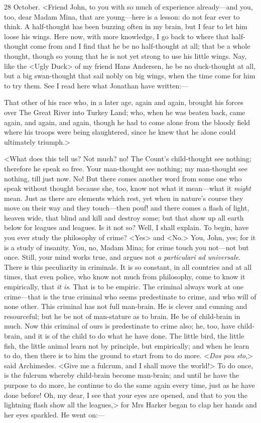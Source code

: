 \begin{diary}{28 October.}
<Friend John, to you with so much of experience already—and you, too, dear Madam Mina, that are young—here is a lesson: do not fear ever to think. A half-thought has been buzzing often in my brain, but I fear to let him loose his wings. Here now, with more knowledge, I go back to where that half-thought come from and I find that he be no half-thought at all; that be a whole thought, though so young that he is not yet strong to use his little wings. Nay, like the <Ugly Duck> of my friend Hans Andersen, he be no duck-thought at all, but a big swan-thought that sail nobly on big wings, when the time come for him to try them. See I read here what Jonathan have written:—

That other of his race who, in a later age, again and again, brought his forces over The Great River into Turkey Land; who, when he was beaten back, came again, and again, and again, though he had to come alone from the bloody field where his troops were being slaughtered, since he knew that he alone could ultimately triumph.>

<What does this tell us? Not much? no! The Count's child-thought see nothing; therefore he speak so free. Your man-thought see nothing; my man-thought see nothing, till just now. No! But there comes another word from some one who speak without thought because she, too, know not what it mean—what it \textit{might} mean. Just as there are elements which rest, yet when in nature's course they move on their way and they touch—then pouf! and there comes a flash of light, heaven wide, that blind and kill and destroy some; but that show up all earth below for leagues and leagues. Is it not so? Well, I shall explain. To begin, have you ever study the philosophy of crime? <Yes> and <No.> You, John, yes; for it is a study of insanity. You, no, Madam Mina; for crime touch you not—not but once. Still, your mind works true, and argues not \textit{a particulari ad universale}. There is this peculiarity in criminals. It is so constant, in all countries and at all times, that even police, who know not much from philosophy, come to know it empirically, that \textit{it is}. That is to be empiric. The criminal always work at one crime—that is the true criminal who seems predestinate to crime, and who will of none other. This criminal has not full man-brain. He is clever and cunning and resourceful; but he be not of man-stature as to brain. He be of child-brain in much. Now this criminal of ours is predestinate to crime also; he, too, have child-brain, and it is of the child to do what he have done. The little bird, the little fish, the little animal learn not by principle, but empirically; and when he learn to do, then there is to him the ground to start from to do more. <\textit{Dos pou sto},> said Archimedes. <Give me a fulcrum, and I shall move the world!> To do once, is the fulcrum whereby child-brain become man-brain; and until he have the purpose to do more, he continue to do the same again every time, just as he have done before! Oh, my dear, I see that your eyes are opened, and that to you the lightning flash show all the leagues,> for Mrs Harker began to clap her hands and her eyes sparkled. He went on:—


\end{diary}
